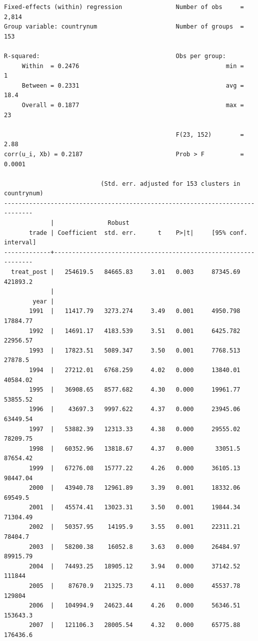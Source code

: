 \documentclass[
]{book}
\begin{document}
\begin{verbatim}
Fixed-effects (within) regression               Number of obs     =      2,814
Group variable: countrynum                      Number of groups  =        153

R-squared:                                      Obs per group:
     Within  = 0.2476                                         min =          1
     Between = 0.2331                                         avg =       18.4
     Overall = 0.1877                                         max =         23

                                                F(23, 152)        =       2.88
corr(u_i, Xb) = 0.2187                          Prob > F          =     0.0001

                           (Std. err. adjusted for 153 clusters in countrynum)
------------------------------------------------------------------------------
             |               Robust
       trade | Coefficient  std. err.      t    P>|t|     [95% conf. interval]
-------------+----------------------------------------------------------------
  treat_post |   254619.5   84665.83     3.01   0.003     87345.69    421893.2
             |
        year |
       1991  |   11417.79   3273.274     3.49   0.001     4950.798    17884.77
       1992  |   14691.17   4183.539     3.51   0.001     6425.782    22956.57
       1993  |   17823.51   5089.347     3.50   0.001     7768.513     27878.5
       1994  |   27212.01   6768.259     4.02   0.000     13840.01    40584.02
       1995  |   36908.65   8577.682     4.30   0.000     19961.77    53855.52
       1996  |    43697.3   9997.622     4.37   0.000     23945.06    63449.54
       1997  |   53882.39   12313.33     4.38   0.000     29555.02    78209.75
       1998  |   60352.96   13818.67     4.37   0.000      33051.5    87654.42
       1999  |   67276.08   15777.22     4.26   0.000     36105.13    98447.04
       2000  |   43940.78   12961.89     3.39   0.001     18332.06     69549.5
       2001  |   45574.41   13023.31     3.50   0.001     19844.34    71304.49
       2002  |   50357.95    14195.9     3.55   0.001     22311.21     78404.7
       2003  |   58200.38    16052.8     3.63   0.000     26484.97    89915.79
       2004  |   74493.25   18905.12     3.94   0.000     37142.52      111844
       2005  |    87670.9   21325.73     4.11   0.000     45537.78      129804
       2006  |   104994.9   24623.44     4.26   0.000     56346.51    153643.3
       2007  |   121106.3   28005.54     4.32   0.000     65775.88    176436.6

\end{verbatim}
\end{document}
